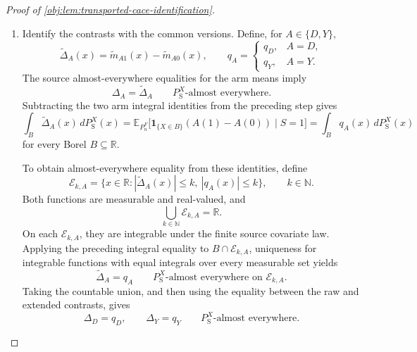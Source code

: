 \begin{proof}[Proof of \cref{obj:lem:transported-cace-identification}]
\begin{enumerate}
Using the source density identity and source support, the preceding equalities become
\[
\begin{aligned}
&\mathbb E_{P_n^F}
 \bigl[\mathbf1_{\{X\in B\}}\pi_z(X)\widetilde m_{Az}(X)
       \mid S=1\bigr]\\
&\qquad=
\int_{B_{\mathcal X}}
 f_{\mathrm S}(x)\pi_z(x)m_{Az}(x)\,dx\\
&\qquad=
\mathbb E_{P_n^F}
 \bigl[\mathbf1_{\{X\in B\}}\pi_z(X)A(z)\mid S=1\bigr].
\end{aligned}
\]
Thus \(\pi_z(X)\widetilde m_{Az}(X)\) is a version of the conditional mean of \(\pi_z(X)A(z)\) given \(X\) in the source population. Since \(\pi_z(X)\) is measurable with respect to \(X\), the conditional-expectation multiplication rule gives
\[
\pi_z(X)\widetilde m_{Az}(X)
=
\mathbb E_{P_n^F}[\pi_z(X)A(z)\mid X,S=1]
=
\pi_z(X)\mathbb E_{P_n^F}[A(z)\mid X,S=1].
\]
The positive lower bound on \(\pi_z(X)\) permits cancellation:
\[
\widetilde m_{Az}(X)
=\mathbb E_{P_n^F}[A(z)\mid X,S=1]
\qquad\text{almost surely in the source population}.
\]
Equivalently, for every Borel \(B\subseteq\mathbb R\),
\[
\mathbb E_{P_n^F}
 \bigl[\mathbf1_{\{X\in B\}}A(z)\mid S=1\bigr]
=
\int_B\widetilde m_{Az}(x)\,dP_{\mathrm S}^{X}(x).
\]

\item Identify the contrasts with the common versions. Define, for \(A\in\{D,Y\}\),
\[
\widetilde\Delta_A(x)
=\widetilde m_{A1}(x)-\widetilde m_{A0}(x),
\qquad
q_A=
\begin{cases}
q_D,&A=D,\\
q_Y,&A=Y.
\end{cases}
\]
The source almost-everywhere equalities for the arm means imply
\[
\Delta_A=\widetilde\Delta_A
\qquad P_{\mathrm S}^{X}\text{-almost everywhere}.
\]
Subtracting the two arm integral identities from the preceding step gives
\[
\int_B\widetilde\Delta_A(x)\,dP_{\mathrm S}^{X}(x)
=
\mathbb E_{P_n^F}
 \bigl[\mathbf1_{\{X\in B\}}(A(1)-A(0))\mid S=1\bigr]
=
\int_Bq_A(x)\,dP_{\mathrm S}^{X}(x)
\]
for every Borel \(B\subseteq\mathbb R\).

To obtain almost-everywhere equality from these identities, define
\[
\mathcal E_{k,A}
=
\bigl\{x\in\mathbb R:
 |\widetilde\Delta_A(x)|\le k,\ |q_A(x)|\le k\bigr\},
\qquad k\in\mathbb N.
\]
Both functions are measurable and real-valued, and
\[
\bigcup_{k\in\mathbb N}\mathcal E_{k,A}=\mathbb R.
\]
On each \(\mathcal E_{k,A}\), they are integrable under the finite source covariate law. Applying the preceding integral equality to
\(B\cap\mathcal E_{k,A}\), uniqueness for integrable functions with equal integrals over every measurable set yields
\[
\widetilde\Delta_A=q_A
\qquad
P_{\mathrm S}^{X}\text{-almost everywhere on }\mathcal E_{k,A}.
\]
Taking the countable union, and then using the equality between the raw and extended contrasts, gives
\[
\Delta_D=q_D,\qquad \Delta_Y=q_Y
\qquad P_{\mathrm S}^{X}\text{-almost everywhere}.
\]


\end{enumerate}
\end{proof}
